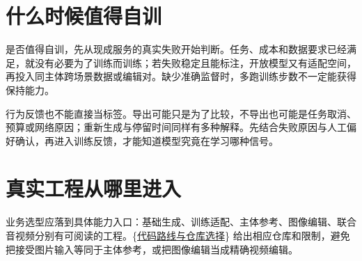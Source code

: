 \section{什么时候值得自训}\label{seedance-m14-ux4ec0ux4e48ux65f6ux5019ux503cux5f97ux81eaux8bad}

是否值得自训，先从现成服务的真实失败开始判断。任务、成本和数据要求已经满足，就没有必要为了训练而训练；若失败稳定且能标注，开放模型又有适配空间，再投入同主体跨场景数据或编辑对。缺少准确监督时，多跑训练步数不一定能获得保持能力。

行为反馈也不能直接当标签。导出可能只是为了比较，不导出也可能是任务取消、预算或网络原因；重新生成与停留时间同样有多种解释。先结合失败原因与人工偏好确认，再进入训练反馈，才能知道模型究竟在学习哪种信号。

\section{真实工程从哪里进入}\label{seedance-m14-ux771fux5b9eux5de5ux7a0bux4eceux54eaux91ccux8fdbux5165}

业务选型应落到具体能力入口：基础生成、训练适配、主体参考、图像编辑、联合音视频分别有可阅读的工程。\{\hyperref[seedance-m15]{代码路线与仓库选择}\} 给出相应仓库和限制，避免把接受图片输入等同于主体参考，或把图像编辑当成精确视频编辑。
